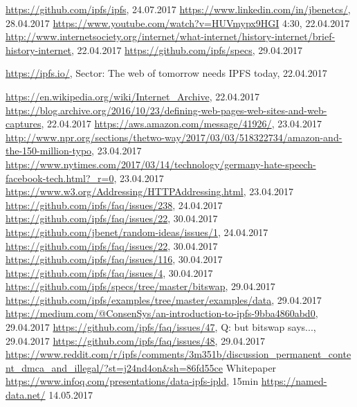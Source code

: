 \documentclass[a4paper,11pt, oneside]{report}
\theoremstyle{definition}
\begin{document}
\begin{thebibliography}{1}

 \url{https://github.com/ipfs/ipfs}, 24.07.2017
 \url{https://www.linkedin.com/in/jbenetcs/}, 28.04.2017
 \url{https://www.youtube.com/watch?v=HUVmypx9HGI} 4:30, 22.04.2017
 \url{http://www.internetsociety.org/internet/what-internet/history-internet/brief-history-internet}, 22.04.2017
 \url{https://github.com/ipfs/specs}, 29.04.2017

 \url{https://ipfs.io/}, Sector: The web of tomorrow needs IPFS today, 22.04.2017

 \url{https://en.wikipedia.org/wiki/Internet_Archive}, 22.04.2017
 \url{https://blog.archive.org/2016/10/23/defining-web-pages-web-sites-and-web-captures}, 22.04.2017
 \url{https://aws.amazon.com/message/41926/}, 23.04.2017
 \url{http://www.npr.org/sections/thetwo-way/2017/03/03/518322734/amazon-and-the-150-million-typo}, 23.04.2017
 \url{https://www.nytimes.com/2017/03/14/technology/germany-hate-speech-facebook-tech.html?_r=0}, 23.04.2017
 \url{https://www.w3.org/Addressing/HTTPAddressing.html}, 23.04.2017 
\url{https://github.com/ipfs/faq/issues/238}, 24.04.2017
 \url{https://github.com/ipfs/faq/issues/22}, 30.04.2017
 \url{https://github.com/jbenet/random-ideas/issues/1}, 24.04.2017
 \url{https://github.com/ipfs/faq/issues/22}, 30.04.2017
 \url{https://github.com/ipfs/faq/issues/116}, 30.04.2017
 \url{https://github.com/ipfs/faq/issues/4}, 30.04.2017
 \url{https://github.com/ipfs/specs/tree/master/bitswap}, 29.04.2017
 \url{https://github.com/ipfs/examples/tree/master/examples/data}, 29.04.2017
 \url{https://medium.com/@ConsenSys/an-introduction-to-ipfs-9bba4860abd0}, 29.04.2017
 \url{https://github.com/ipfs/faq/issues/47}, Q: but bitswap says..., 29.04.2017
 \url{https://github.com/ipfs/faq/issues/48}, 29.04.2017
\url{https://www.reddit.com/r/ipfs/comments/3m351b/discussion_permanent_content_dmca_and_illegal/?st=j24nd4on&sh=86fd55ce}
 Whitepaper
 \url{https://www.infoq.com/presentations/data-ipfs-ipld}, 15min
 \url{https://named-data.net/} 14.05.2017

\end{thebibliography}
\end{document}
